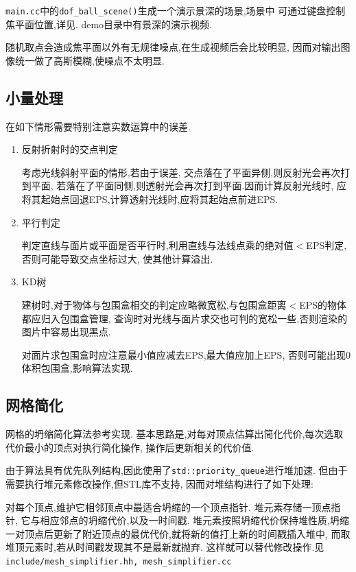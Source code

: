 \verb|main.cc|中的\verb|dof_ball_scene()|生成一个演示景深的场景,场景中
可通过键盘控制焦平面位置,详见. demo目录中有景深的演示视频.

随机取点会造成焦平面以外有无规律噪点,在生成视频后会比较明显,
因而对输出图像统一做了高斯模糊,使噪点不太明显.

\subsection{小量处理}
在如下情形需要特别注意实数运算中的误差.
\begin{enumerate}
  \item 反射折射时的交点判定

    考虑光线斜射平面的情形,若由于误差, 交点落在了平面异侧,则反射光会再次打到平面,
    若落在了平面同侧,则透射光会再次打到平面.因而计算反射光线时,
    应将其起始点回退EPS,计算透射光线时,应将其起始点前进EPS.

  \item 平行判定

    判定直线与面片或平面是否平行时,利用直线与法线点乘的绝对值$<$EPS判定,
    否则可能导致交点坐标过大, 使其他计算溢出.

  \item KD树

    建树时,对于物体与包围盒相交的判定应略微宽松,与包围盒距离$<$EPS的物体都应归入包围盒管理,
    查询时对光线与面片求交也可判的宽松一些,否则渲染的图片中容易出现黑点.

    对面片求包围盒时应注意最小值应减去EPS,最大值应加上EPS,
    否则可能出现0体积包围盒,影响算法实现.
\end{enumerate}

\subsection{网格简化}
网格的坍缩简化算法参考\cite{mesh}实现.
基本思路是,对每对顶点估算出简化代价,每次选取代价最小的顶点对执行简化操作,
操作后更新相关的代价值.

由于算法具有优先队列结构,因此使用了\verb|std::priority_queue|进行堆加速.
但由于需要执行堆元素修改操作,但STL库不支持, 因而对堆结构进行了如下处理:

对每个顶点,维护它相邻顶点中最适合坍缩的一个顶点指针.
堆元素存储一顶点指针, 它与相应邻点的坍缩代价,以及一时间戳.
堆元素按照坍缩代价保持堆性质,坍缩一对顶点后更新了附近顶点的最优代价,就将新的值打上新的时间戳插入堆中,
而取堆顶元素时,若从时间戳发现其不是最新就抛弃.
这样就可以替代修改操作.见\verb|include/mesh_simplifier.hh, mesh_simplifier.cc|


